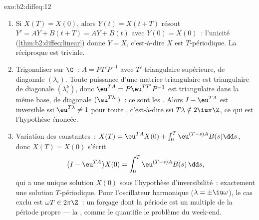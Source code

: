 \begin{solution}{exo:b2:diffeq:12}
\begin{enumerate}
  \item Si $X(T) = X(0)$, alors $Y(t) = X(t + T)$ résout $Y' =
        AY + B(t + T) = AY + B(t)$ avec $Y(0) = X(0)$~:
        l'unicité (\cref{thm:b2:diffeq:linear}) donne $Y = X$,
        c'est-à-dire $X$ est $T$-périodique. La réciproque est
        triviale.
  \item Trigonaliser sur $\C$~: $A = PT'P^{-1}$ avec $T'$
        triangulaire supérieure, de diagonale $(\lambda_i)$.
        Toute puissance d'une matrice triangulaire est
        triangulaire de diagonale $(\lambda_i^k)$, donc $\eu^{TA}
        = P\eu^{TT'}P^{-1}$ est triangulaire dans la même base,
        de diagonale $(\eu^{T\lambda_i})$~: ce sont les . Alors $I - \eu^{TA}$ est inversible ssi
        $\eu^{T\lambda} \neq 1$ pour toute ,
        c'est-à-dire ssi $T\lambda \notin 2\iu\pi\Z$, ce qui est
        l'hypothèse énoncée.
  \item Variation des constantes~: $X(T) = \eu^{TA}X(0) +
        \int_0^T\eu^{(T-s)A}B(s)\dd s$, donc $X(T) = X(0)$
        s'écrit
        \[
        \bigl(I - \eu^{TA}\bigr)X(0) =
        \int_0^{T}\eu^{(T-s)A}B(s)\,\dd s ,
        \]
        qui a une unique solution $X(0)$ sous l'hypothèse
        d'inversibilité~: exactement une solution $T$-périodique.
        Pour l'oscillateur harmonique ($\lambda =
        \pm\iu\omega$), le cas exclu est $\omega T \in
        2\pi\Z$~: un forçage dont la période est un multiple de
        la période propre --- la , comme le quantifie le
        problème du week-end.
\end{enumerate}
\end{solution}

